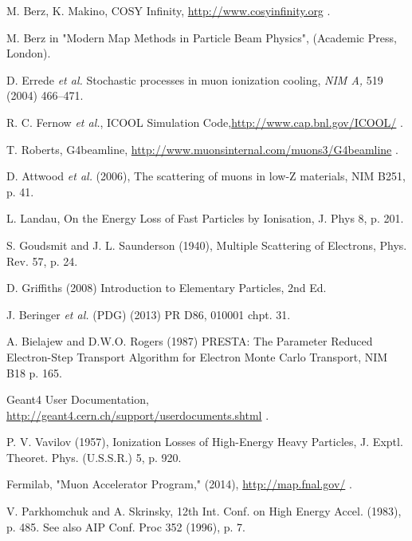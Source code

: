 \documentclass{jacow}
\begin{document}
\begin{thebibliography}{9}

M. Berz, K. Makino, COSY Infinity, \url{http://www.cosyinfinity.org} .

M. Berz in "Modern Map Methods in Particle Beam Physics", (Academic Press, London).

D. Errede \emph{et al.} Stochastic processes in muon ionization cooling, \emph {NIM A,} 519 (2004) 466--471.

R. C. Fernow \emph{et al.}, ICOOL Simulation Code,\url{http://www.cap.bnl.gov/ICOOL/} .

T. Roberts, G4beamline, \url{http://www.muonsinternal.com/muons3/G4beamline} .

D. Attwood \emph{et al.} (2006), The scattering of muons in low-Z materials, NIM B251, p. 41.

L. Landau, On the Energy Loss of Fast Particles by Ionisation, J. Phys 8, p. 201.

S. Goudsmit and J. L. Saunderson (1940), Multiple Scattering of Electrons, Phys. Rev. 57, p. 24.

D. Griffiths (2008) Introduction to Elementary Particles, 2nd Ed. 

J. Beringer \emph{et al.} (PDG) (2013) PR D86, 010001 chpt. 31.

A. Bielajew and D.W.O. Rogers (1987) PRESTA: The Parameter Reduced Electron-Step Transport Algorithm for Electron Monte Carlo Transport, NIM B18 p. 165.

Geant4 User Documentation, \url{http://geant4.cern.ch/support/userdocuments.shtml} .

P. V. Vavilov (1957), Ionization Losses of High-Energy Heavy Particles, J. Exptl. Theoret. Phys. (U.S.S.R.) 5, p. 920.

Fermilab, "Muon Accelerator Program," (2014), \url{http://map.fnal.gov/} .

V. Parkhomchuk and A. Skrinsky, 12th Int. Conf. on High Energy Accel. (1983), p. 485. See also AIP Conf. Proc 352 (1996), p. 7. 

\end{thebibliography}
\end{document}
